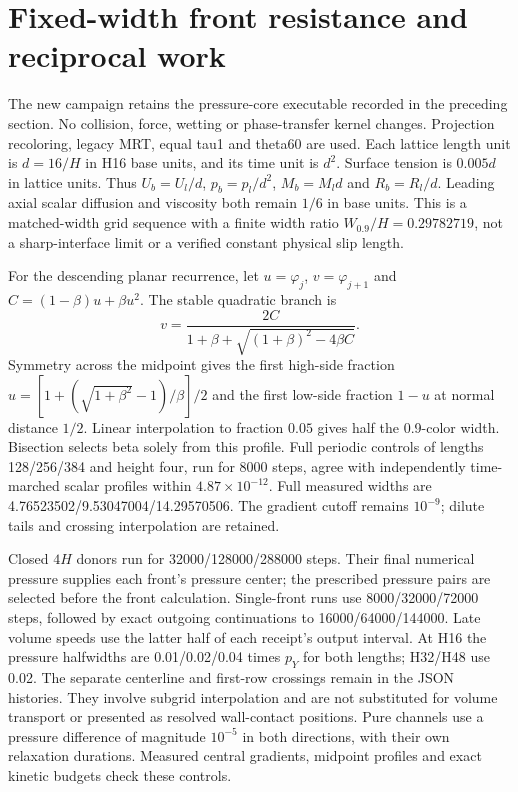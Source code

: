 \section{Fixed-width front resistance and reciprocal work}
The new campaign retains the pressure-core executable recorded in the
preceding section. No collision, force, wetting or phase-transfer kernel
changes. Projection recoloring, legacy MRT, equal tau1 and theta60 are used.
Each lattice length unit is $d=16/H$ in H16 base units, and its time unit
is $d^2$. Surface tension is $0.005d$ in lattice units. Thus
$U_b=U_l/d$, $p_b=p_l/d^2$, $M_b=M_l d$ and $R_b=R_l/d$.
Leading axial scalar diffusion and viscosity both remain $1/6$ in base units.
This is a matched-width grid sequence with a finite width ratio
$W_{0.9}/H=0.29782719$, not a sharp-interface limit or a verified
constant physical slip length.

For the descending planar recurrence, let $u=\varphi_j$, $v=\varphi_{j+1}$
and $C=(1-\beta)u+\beta u^2$. The stable quadratic branch is
\begin{equation}
 v=\frac{2C}{1+\beta+\sqrt{(1+\beta)^2-4\beta C}}.
\end{equation}
Symmetry across the midpoint gives the first high-side fraction
$u=[1+(\sqrt{1+\beta^2}-1)/\beta]/2$ and the first low-side fraction
$1-u$ at normal distance $1/2$. Linear interpolation to fraction $0.05$
gives half the 0.9-color width. Bisection selects beta solely from this
profile. Full periodic controls of lengths 128/256/384 and height four,
run for 8000 steps, agree with independently time-marched scalar profiles
within $4.87\times10^{-12}$. Full measured widths are
4.76523502/9.53047004/14.29570506. The gradient cutoff remains $10^{-9}$;
dilute tails and crossing interpolation are retained.

Closed $4H$ donors run for 32000/128000/288000 steps.
Their final numerical pressure supplies each front's pressure center;
the prescribed pressure pairs are selected before the front calculation.
Single-front runs use 8000/32000/72000 steps, followed by exact outgoing
continuations to 16000/64000/144000. Late volume speeds use the latter
half of each receipt's output interval. At H16 the pressure halfwidths are
0.01/0.02/0.04 times $p_Y$ for both lengths; H32/H48 use 0.02.
The separate centerline and first-row crossings remain in the JSON
histories. They involve subgrid interpolation and are not substituted for
volume transport or presented as resolved wall-contact positions.
Pure channels use a pressure difference of magnitude $10^{-5}$ in both
directions, with their own relaxation durations. Measured central gradients,
midpoint profiles and exact kinetic budgets check these controls.

